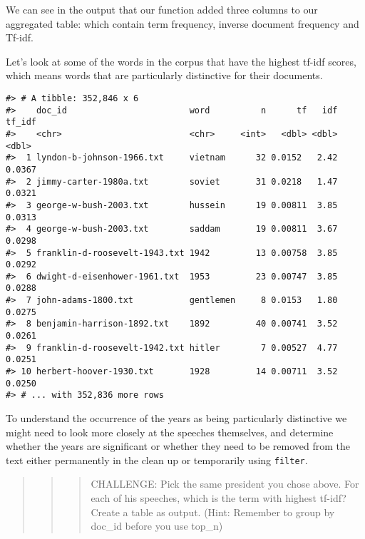 \documentclass[]{book}
\newenvironment{Shaded}{\begin{snugshade}}{\end{snugshade}}
\newcommand{\DataTypeTok}[1]{\textcolor[rgb]{0.13,0.29,0.53}{#1}}
\newcommand{\KeywordTok}[1]{\textcolor[rgb]{0.13,0.29,0.53}{\textbf{#1}}}
\newcommand{\NormalTok}[1]{#1}
\newcommand{\OperatorTok}[1]{\textcolor[rgb]{0.81,0.36,0.00}{\textbf{#1}}}
\newcommand{\OtherTok}[1]{\textcolor[rgb]{0.56,0.35,0.01}{#1}}
\newcommand{\StringTok}[1]{\textcolor[rgb]{0.31,0.60,0.02}{#1}}
\begin{document}
We can see in the output that our function added three columns to our aggregated table: which contain term frequency, inverse document frequency and Tf-idf.

Let's look at some of the words in the corpus that have the highest tf-idf scores, which means words that are particularly distinctive for their documents.

\begin{Shaded}
\end{Shaded}

\begin{verbatim}
#> # A tibble: 352,846 x 6
#>    doc_id                        word          n      tf   idf tf_idf
#>    <chr>                         <chr>     <int>   <dbl> <dbl>  <dbl>
#>  1 lyndon-b-johnson-1966.txt     vietnam      32 0.0152   2.42 0.0367
#>  2 jimmy-carter-1980a.txt        soviet       31 0.0218   1.47 0.0321
#>  3 george-w-bush-2003.txt        hussein      19 0.00811  3.85 0.0313
#>  4 george-w-bush-2003.txt        saddam       19 0.00811  3.67 0.0298
#>  5 franklin-d-roosevelt-1943.txt 1942         13 0.00758  3.85 0.0292
#>  6 dwight-d-eisenhower-1961.txt  1953         23 0.00747  3.85 0.0288
#>  7 john-adams-1800.txt           gentlemen     8 0.0153   1.80 0.0275
#>  8 benjamin-harrison-1892.txt    1892         40 0.00741  3.52 0.0261
#>  9 franklin-d-roosevelt-1942.txt hitler        7 0.00527  4.77 0.0251
#> 10 herbert-hoover-1930.txt       1928         14 0.00711  3.52 0.0250
#> # ... with 352,836 more rows
\end{verbatim}

To understand the occurrence of the years as being particularly distinctive we might need to look more closely at the speeches themselves, and determine whether the years are significant or whether they need to be removed from the text either permanently in the clean up or temporarily using \texttt{filter}.

\begin{quote}
\begin{quote}
\begin{quote}
CHALLENGE: Pick the same president you chose above. For each of his speeches, which is the term with highest tf-idf? Create a table as output. (Hint: Remember to group by doc\_id before you use top\_n)
\end{quote}
\end{quote}
\end{quote}
\end{document}
